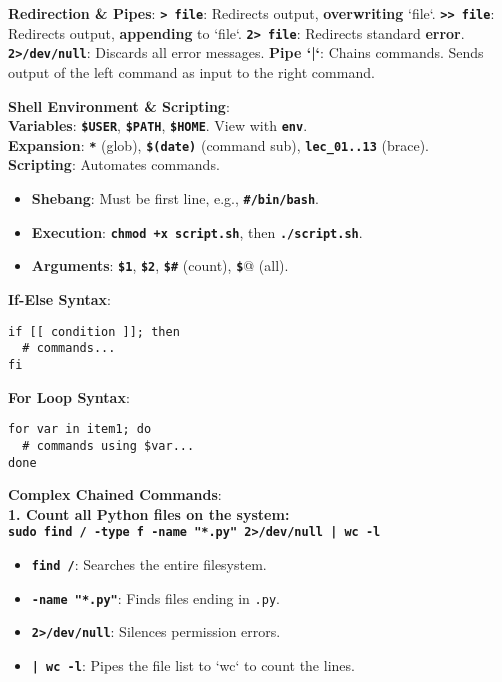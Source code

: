 \documentclass[10pt, a4paper]{article}
\newcommand{\cmd}[1]{\texttt{\textbf{#1}}}
\begin{document}
\begin{multicols}{3}
\textbf{Redirection \& Pipes}:
\cmd{> file}: Redirects output, \textbf{overwriting} `file`.
\cmd{>> file}: Redirects output, \textbf{appending} to `file`.
\cmd{2> file}: Redirects standard \textbf{error}.
\cmd{2>/dev/null}: Discards all error messages.
\textbf{Pipe `|`}: Chains commands. Sends output of the left command as input to the right command.

\textbf{Shell Environment \& Scripting}: \\
\textbf{Variables}: \cmd{\$USER}, \cmd{\$PATH}, \cmd{\$HOME}. View with \cmd{env}. \\
\textbf{Expansion}: \cmd{*} (glob), \cmd{\$(date)} (command sub), \cmd{lec\_{01..13}} (brace). \\
\textbf{Scripting}: Automates commands.
\begin{itemize}[nosep] %
    \item \textbf{Shebang}: Must be first line, e.g., \cmd{\#\!/bin/bash}.
    \item \textbf{Execution}: \cmd{chmod +x script.sh}, then \cmd{./script.sh}.
    \item \textbf{Arguments}: \cmd{\$1}, \cmd{\$2}, \cmd{\$\#} (count), \cmd{\$}@ (all).
\end{itemize}
\textbf{If-Else Syntax}:
\begin{verbatim}
if [[ condition ]]; then
  # commands...
fi
\end{verbatim}
\textbf{For Loop Syntax}:
\begin{verbatim}
for var in item1; do
  # commands using $var...
done
\end{verbatim}


\textbf{Complex Chained Commands}: \\
\textbf{1. Count all Python files on the system:} \\
\cmd{sudo find / -type f -name "*.py" 2>/dev/null | wc -l}
\begin{itemize}[nosep] %
    \item \cmd{find /}: Searches the entire filesystem.
    \item \cmd{-name "*.py"}: Finds files ending in \texttt{.py}.
    \item \cmd{2>/dev/null}: Silences permission errors.
    \item \cmd{| wc -l}: Pipes the file list to `wc` to count the lines.
\end{itemize}


\end{multicols}
\end{document}
